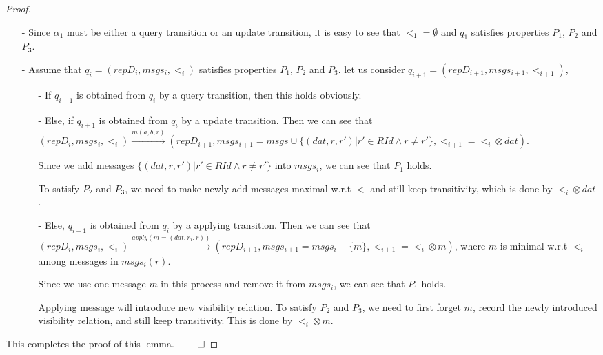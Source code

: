 {\begin {proof}
\begin{itemize}
\item[-] Since $\alpha_1$ must be either a query transition or an update transition, it is easy to see that $<_1 = \emptyset$ and $q_1$ satisfies properties $P_1$, $P_2$ and $P_3$.

\item[-] Assume that $q_i=(repD_i,msgs_i,<_i)$ satisfies properties $P_1$, $P_2$ and $P_3$. let us consider $q_{i+1}= (repD_{i+1},msgs_{i+1},<_{i+1})$,

    \begin{itemize}
    \setlength{\itemsep}{0.5pt}
    \item[-] If $q_{i+1}$ is obtained from $q_i$ by a query transition, then this holds obviously.

    \item[-] Else, if $q_{i+1}$ is obtained from $q_i$ by a update transition. Then we can see that $(repD_i,msgs_i,<_i) {\xrightarrow{m(a,b,r)}} (repD_{i+1},msgs_{i+1}=msgs \cup \{ (dat,r,r') \vert  r' \in RId \wedge r \neq r' \},<_{i+1} = <_i \otimes dat)$.

        Since we add messages $\{ (dat,r,r') \vert  r' \in RId \wedge r \neq r' \}$ into $msgs_i$, we can see that $P_1$ holds.

        To satisfy $P_2$ and $P_3$, we need to make newly add messages maximal w.r.t $<$ and still keep transitivity, which is done by $<_i \otimes dat$.

    \item[-] Else, $q_{i+1}$ is obtained from $q_i$ by a applying transition. Then we can see that $(repD_i,msgs_i,<_i) {\xrightarrow{apply(m=(dat,r_1,r))}} (repD_{i+1},msgs_{i+1} = msgs_i - \{ m \}, <_{i+1} = <_i \otimes m )$, where $m$ is minimal w.r.t $<_i$ among messages in $msgs_i(r)$.

        Since we use one message $m$ in this process and remove it from $msgs_i$, we can see that $P_1$ holds.

        Applying message will introduce new visibility relation. To satisfy $P_2$ and $P_3$, we need to first forget $m$, record the newly introduced visibility relation, and still keep transitivity. This is done by $<_i \otimes m$.
    \end{itemize}
\end{itemize}

This completes the proof of this lemma. $\qed$
\end {proof}
}





